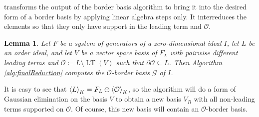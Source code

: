 \documentclass[11pt,oneside,english]{amsart}
\makeatletter
\numberwithin{equation}{section}
\numberwithin{figure}{section}
\theoremstyle{plain}
\theoremstyle{definition}
\theoremstyle{definition}
\theoremstyle{remark}
\theoremstyle{plain}
\newtheorem{lem}[thm]{Lemma}
\theoremstyle{plain}
\theoremstyle{plain}
\theoremstyle{problem@}
\makeatother
\begin{document}
transforms the output of the border basis algorithm to bring it into
the desired form of a border basis by applying linear algebra steps
only. It interreduces the elements so that they only have support
in the leading term and ${\mathcal{O}}$. 
\begin{lem}
\cite[Proposition 17]{kehrein2006cbb}\label{lem:finalRed} Let $F$
be a system of generators of a zero-dimensional ideal $I$, let $L$
be an order ideal, and let $V$ be a vector space basis of $F_{L}$ with pairwise
different leading terms and ${\mathcal{O}}\coloneqq L\setminus\operatorname{LT}(V)$ such
that $\partial{\mathcal{O}}\subseteq L$.
Then Algorithm \ref{alg:finalReduction} computes the ${\mathcal{O}}$-border
basis $\mathcal{G}$ of $I$. \end{lem}
It is easy to see that ${{\left\langle {L}\right\rangle}\sb{K}}=F_{L}\oplus{{\left\langle {\mathcal{O}}\right\rangle}\sb{K}}$,
so the algorithm will do a form of Gaussian elimination
on the basis \(V\) to obtain a new basis \(V_{R}\)
with all non-leading terms supported on \({\mathcal{O}}\).
Of course, this new basis will contain an \({\mathcal{O}}\)-border basis.
\end{document}
